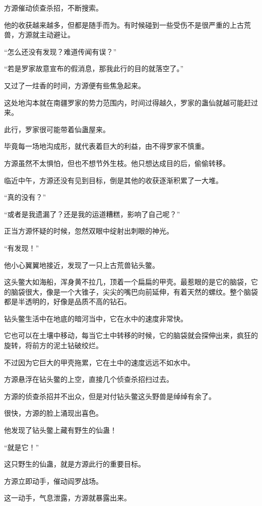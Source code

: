 \begin{this_body}
方源催动侦查杀招，不断搜索。

他的收获越来越多，但都是随手而为。有时候碰到一些受伤不是很严重的上古荒兽，方源就主动避让。

“怎么还没有发现？难道传闻有误？”

“若是罗家故意宣布的假消息，那我此行的目的就落空了。”

又过了一炷香的时间，方源便有些焦急起来。

这处地沟本就在南疆罗家的势力范围内，时间过得越久，罗家的蛊仙就越可能赶过来。

此行，罗家很可能带着仙蛊屋来。

毕竟每一场地沟成形，就代表着巨大的利益，由不得罗家不慎重。

方源虽然不太惧怕，但也不想节外生枝。他只想达成目的后，偷偷转移。

临近中午，方源还没有见到目标，倒是其他的收获逐渐积累了一大堆。

“真的没有？”

“或者是我遗漏了？还是我的运道糟糕，影响了自己呢？”

正当方源怀疑的时候，忽然双眼中绽射出刺眼的神光。

“有发现！”

他小心翼翼地接近，发现了一只上古荒兽钻头鳖。

这头鳖大如海船，浑身黄不拉几，顶着一个扁扁的甲壳。最惹眼的是它的脑袋，它的脑袋很大，像是一个大锥子，尖尖的嘴巴向前延伸，有着天然的螺纹。整个脑袋都是半透明的，好像是品质不高的钻石。

钻头鳖生活中在地底的暗河当中，它在水中的速度非常快。

它也可以在土壤中移动，每当它土中转移的时候，它的脑袋就会探伸出来，疯狂的旋转，将前方的泥土钻破绞烂。

不过因为它巨大的甲壳拖累，它在土中的速度远远不如水中。

方源悬浮在钻头鳖的上空，直接几个侦查杀招扫过去。

方源的侦查杀招并不出众，但是对付钻头鳖这头野兽是绰绰有余了。

很快，方源的脸上涌现出喜色。

他发现了钻头鳖上藏有野生的仙蛊！

“就是它！”

这只野生的仙蛊，就是方源此行的重要目标。

方源立即动手，催动阎罗战场。

这一动手，气息泄露，方源就暴露出来。


\end{this_body}
